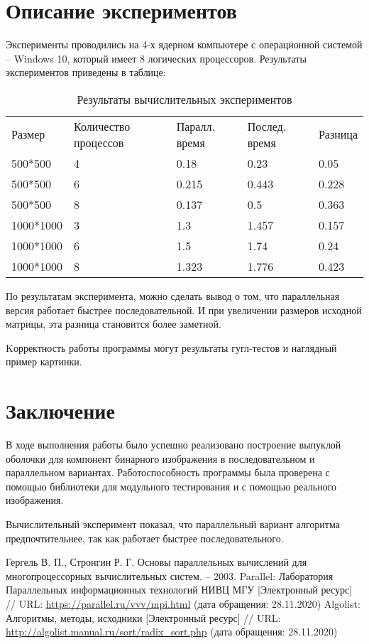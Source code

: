 \documentclass{report}
\begin{document}
\section*{Описание экспериментов}
Эксперименты проводились на 4-х ядерном компьютере с операционной системой – Windows 10, который имеет 8 логических процессоров. Результаты экспериментов приведены в таблице:
\begin{table}[!h]
\caption{Результаты вычислительных экспериментов}
\centering
\begin{tabular}{lllll}
Размер & Количество процессов & Паралл. время & Послед. время & Разница\\
500*500 & 4 & 0.18 & 0.23 & 0.05\\
500*500 & 6 & 0.215 & 0.443 & 0.228\\
500*500 & 8 & 0.137 & 0.5 & 0.363\\
1000*1000 & 3 & 1.3 & 1.457 & 0.157\\
1000*1000 & 6 & 1.5 & 1.74 & 0.24\\
1000*1000 & 8 & 1.323 & 1.776 & 0.423\\
\end{tabular}
\end{table}
\par
По результатам эксперимента, можно сделать вывод о том, что параллельная версия работает быстрее последовательной. И при увеличении размеров исходной матрицы, эта разница становится более заметной.
\par
Kорректность работы программы могут результаты гугл-тестов и наглядный пример картинки.
\newpage

\section*{Заключение}
В ходе выполнения работы было успешно реализовано построение выпуклой оболочки для компонент бинарного изображения в последовательном и параллельном вариантах. Работоспособность программы была проверена с помощью библиотеки для модульного тестирования и с помощью реального изображения.
\par 
Вычислительный эксперимент показал, что параллельный вариант алгоритма предпочтительнее, так как работает быстрее последовательного.
\newpage

\begin{thebibliography}{1}
Гергель В. П., Стронгин Р. Г. Основы параллельных вычислений для многопроцессорных вычислительных систем. – 2003.
 Parallel: Лаборатория Параллельных информационных технологий НИВЦ МГУ [Электронный ресурс] // URL: \url {https://parallel.ru/vvv/mpi.html} (дата обращения: 28.11.2020)
 Algolist: Алгоритмы, методы, исходники [Электронный ресурс] // URL: \url {http://algolist.manual.ru/sort/radix_sort.php} (дата обращения: 28.11.2020)
\end{thebibliography}
\newpage
\end{document}
